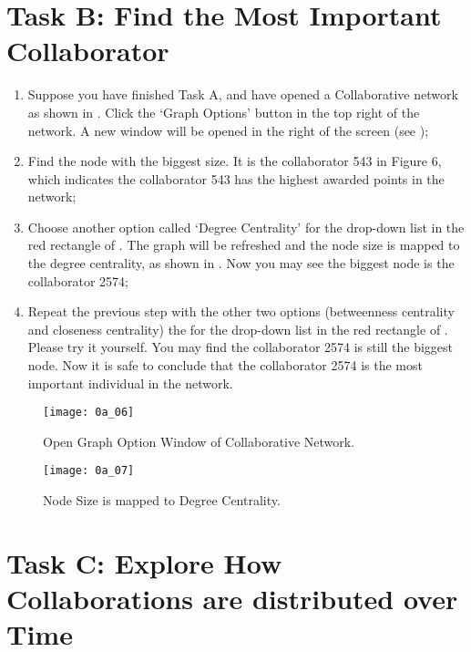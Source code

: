 \section{Task B: Find the Most Important Collaborator}

\begin{enumerate}
	\item Suppose you have finished Task A, and have opened a Collaborative network as shown in . Click the `Graph Options' button in the top right of the network. A new window will be opened in the right of the screen (see ); \\
	\item Find the node with the biggest size. It is the collaborator 543 in Figure 6, which indicates the collaborator 543 has the highest awarded points in the network; \\
	\item Choose another option called `Degree Centrality' for the drop-down list in the red rectangle of . The graph will be refreshed and the node size is mapped to the degree centrality, as shown in . Now you may see the biggest node is the collaborator 2574; \\
	\item Repeat the previous step with the other two options (betweenness centrality and closeness centrality) the for the drop-down list in the red rectangle of . Please try it yourself. You may find the collaborator 2574 is still the biggest node. Now it is safe to conclude that the collaborator 2574 is the most important individual in the network.
\end{enumerate}

\begin{figure}[!htb]
  \centering
  \texttt{[image: 0a\_06]}
  \caption{Open Graph Option Window of Collaborative Network.}
  \label{Figure:0a_06}
\end{figure}

\begin{figure}[!htb]
  \centering
  \texttt{[image: 0a\_07]}
  \caption{Node Size is mapped to Degree Centrality.}
  \label{Figure:0a_07}
\end{figure}

\section{Task C: Explore How Collaborations are distributed over Time}

